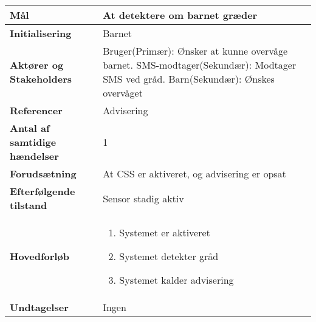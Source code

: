 \begin{table}[H] \centering
\begin{tabular}{|p{6cm}|p{8cm}|}
	\hline
		\textbf{Mål} &
			At detektere om barnet græder \\\hline
		\textbf{Initialisering} &
			Barnet \\\hline
		\textbf{Aktører og Stakeholders} &
			Bruger(Primær): Ønsker at kunne overvåge barnet. SMS-modtager(Sekundær): Modtager SMS ved gråd. Barn(Sekundær): Ønskes overvåget 						\\\hline
		\textbf{Referencer}						
			&Advisering \\\hline
		\textbf{Antal af samtidige hændelser} &
			1 \\\hline
		\textbf{Forudsætning} & 
			At CSS er aktiveret, og advisering er opsat \\\hline
		\textbf{Efterfølgende tilstand} &
			Sensor stadig aktiv \\\hline
		\textbf{Hovedforløb} &
			\begin{enumerate}

	
				\item Systemet er aktiveret
												
				\item Systemet detekter gråd
												
				\item Systemet kalder advisering
								
			\end{enumerate}\\\hline
	
		\textbf{Undtagelser} &
			Ingen \\\hline
			
	\end{tabular}
	\label{UC5} 
\end{table}

